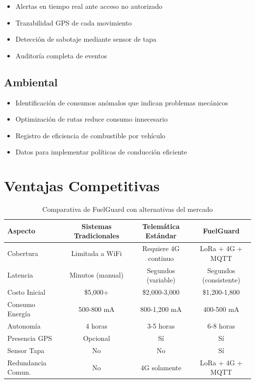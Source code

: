 \documentclass[12pt,a4paper,oneside]{report}
\begin{document}
\begin{itemize}
    \item Alertas en tiempo real ante acceso no autorizado
    \item Trazabilidad GPS de cada movimiento
    \item Detección de sabotaje mediante sensor de tapa
    \item Auditoría completa de eventos
\end{itemize}

\subsection{Ambiental}

\begin{itemize}
    \item Identificación de consumos anómalos que indican problemas mecánicos
    \item Optimización de rutas reduce consumo innecesario
    \item Registro de eficiencia de combustible por vehículo
    \item Datos para implementar políticas de conducción eficiente
\end{itemize}

\section{Ventajas Competitivas}

\begin{table}[H]
    \centering
    \begin{tabular}{|l|c|c|c|}
        \hline
        \textbf{Aspecto} & \textbf{Sistemas Tradicionales} & \textbf{Telemática Estándar} & \textbf{FuelGuard} \\
        \hline
        Cobertura & Limitada a WiFi & Requiere 4G continuo & LoRa + 4G + MQTT \\
        Latencia & Minutos (manual) & Segundos (variable) & Segundos (consistente) \\
        Costo Inicial & \$5,000+ & \$2,000-3,000 & \$1,200-1,800 \\
        Consumo Energía & 500-800 mA & 800-1,200 mA & 400-500 mA \\
        Autonomía & 4 horas & 3-5 horas & 6-8 horas \\
        Presencia GPS & Opcional & Sí & Sí \\
        Sensor Tapa & No & No & Sí \\
        Redundancia Comun. & No & 4G solamente & LoRa + 4G + MQTT \\
        \hline
    \end{tabular}
    \caption{Comparativa de FuelGuard con alternativas del mercado}
\end{table}
\end{document}
